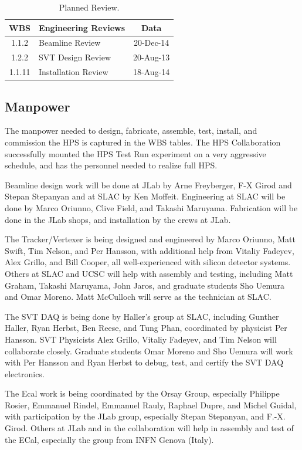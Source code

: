 \begin{table}[htdp]
\caption{Planned Review.}
\begin{center}
\begin{tabular}{|c|l|c|}
\hline
WBS&Engineering Reviews& Data\\
\hline
\hline
1.1.2 &	Beamline  Review&	20-Dec-14\\
\hline
1.2.2	&SVT Design Review	&20-Aug-13\\
\hline
1.1.11&	Installation Review	&18-Aug-14\\
\hline
\hline
\end{tabular}
\end{center}
\label{tb:reviews}
\end{table}%

\subsection{Manpower}

The manpower needed to design, fabricate, assemble, test, install, and commission the HPS is captured in the WBS tables. 
The HPS Collaboration successfully mounted the HPS Test Run experiment on a very aggressive schedule, and has the personnel needed to realize full HPS.

Beamline design work will be done at JLab by Arne Freyberger, F-X Girod and Stepan Stepanyan and at SLAC by Ken Moffeit. 
Engineering at SLAC will be done by Marco Oriunno, Clive Field, and Takashi Maruyama. Fabrication will be done in the 
JLab shops, and installation by the crews at JLab. 

The Tracker/Vertexer is being designed and engineered by Marco Oriunno, Matt Swift, Tim Nelson, and Per Hansson, with additional help 
from Vitaliy Fadeyev, Alex Grillo, and Bill Cooper, all well-experienced with silicon detector systems. Others at SLAC and UCSC will 
help with assembly and testing, including Matt Graham, Takashi Maruyama, John Jaros, and 
graduate students Sho Uemura and Omar Moreno. Matt McCulloch will serve as the technician at SLAC.

The SVT DAQ is being done by Haller's group at SLAC, including Gunther Haller, Ryan 
Herbst, Ben Reese, and Tung Phan, coordinated by physicist Per Hansson. SVT Physicists Alex Grillo, Vitaliy Fadeyev, and Tim Nelson will collaborate closely. 
Graduate students Omar Moreno and Sho Uemura will work with Per Hansson and Ryan Herbst to debug, test, and certify the SVT DAQ electronics.

The Ecal work is being coordinated by the Orsay Group, especially Philippe Rosier, Emmanuel Rindel, Emmanuel Rauly, Raphael Dupre, and Michel Guidal, 
with participation by the JLab group, especially Stepan Stepanyan, and F.-X. Girod.  Others at JLab and in the collaboration will help in 
assembly and test of the ECal, especially the group from INFN Genova (Italy).

